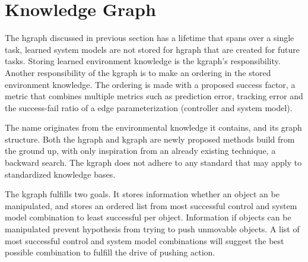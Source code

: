\section{Knowledge Graph}%
\label{sec:kgraph}
The \ac{hgraph} discussed in previous section has a lifetime that spans over a single task, learned system models are not stored for \ac{hgraph} that are created for future tasks. Storing learned environment knowledge is the \ac{kgraph}'s responsibility. Another responsibility of the \ac{kgraph} is to make an ordering in the stored environment knowledge. The ordering is made with a proposed success factor, a metric that combines multiple metrics such as prediction error, tracking error and the success-fail ratio of a edge parameterization (controller and system model).\bs

The name  originates from the environmental knowledge it contains, and its graph structure. Both the \ac{hgraph} and \ac{kgraph} are newly proposed methods build from the ground up, with only inspiration from an already existing technique, a backward search. The \ac{kgraph} does not adhere to any standard that may apply to standardized knowledge bases.\bs





The \ac{kgraph} fulfills two goals. It stores information whether an object an be manipulated, and stores an ordered list from most successful control and system model combination to least successful per object. Information if objects can be manipulated prevent hypothesis from trying to push unmovable objects. A list of most successful control and system model combinations will suggest the best possible combination to fulfill the drive of pushing action.\bs

